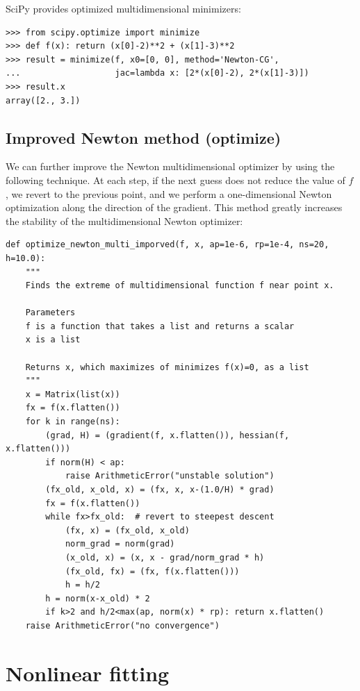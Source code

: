 \documentclass[justified, sixbynine]{tufte-book}
\def\ft{\small\tt}
\theoremstyle{plain}%
\newtheorem * {corollary}{Corollary}
\theoremstyle{definition}
\theoremstyle{remark}
\newtheorem * {remark}{Remark}
\newtheorem * {note}{Note}
\begin{document}
\begin{fullwidth}
SciPy provides optimized multidimensional minimizers:

\begin{lstlisting}
>>> from scipy.optimize import minimize
>>> def f(x): return (x[0]-2)**2 + (x[1]-3)**2
>>> result = minimize(f, x0=[0, 0], method='Newton-CG',
...                   jac=lambda x: [2*(x[0]-2), 2*(x[1]-3)])
>>> result.x
array([2., 3.])
\end{lstlisting}

\goodbreak\subsection{Improved Newton method (optimize)}

We can further improve the Newton multidimensional optimizer by using the following technique. At each step, if the next guess does not reduce the value of $f$, we revert to the previous point, and we perform a one-dimensional Newton optimization along the direction of the gradient. This method greatly increases the stability of the multidimensional Newton optimizer:

\begin{lstlisting}[caption={in file: {\ft nlib.py}}]
def optimize_newton_multi_imporved(f, x, ap=1e-6, rp=1e-4, ns=20, h=10.0):
    """
    Finds the extreme of multidimensional function f near point x.

    Parameters
    f is a function that takes a list and returns a scalar
    x is a list

    Returns x, which maximizes of minimizes f(x)=0, as a list
    """
    x = Matrix(list(x))
    fx = f(x.flatten())
    for k in range(ns):
        (grad, H) = (gradient(f, x.flatten()), hessian(f, x.flatten()))
        if norm(H) < ap:
            raise ArithmeticError("unstable solution")
        (fx_old, x_old, x) = (fx, x, x-(1.0/H) * grad)
        fx = f(x.flatten())
        while fx>fx_old:  # revert to steepest descent
            (fx, x) = (fx_old, x_old)
            norm_grad = norm(grad)
            (x_old, x) = (x, x - grad/norm_grad * h)
            (fx_old, fx) = (fx, f(x.flatten()))
            h = h/2
        h = norm(x-x_old) * 2
        if k>2 and h/2<max(ap, norm(x) * rp): return x.flatten()
    raise ArithmeticError("no convergence")
\end{lstlisting}

\goodbreak\section{Nonlinear fitting}


\end{fullwidth}
\end{document}
